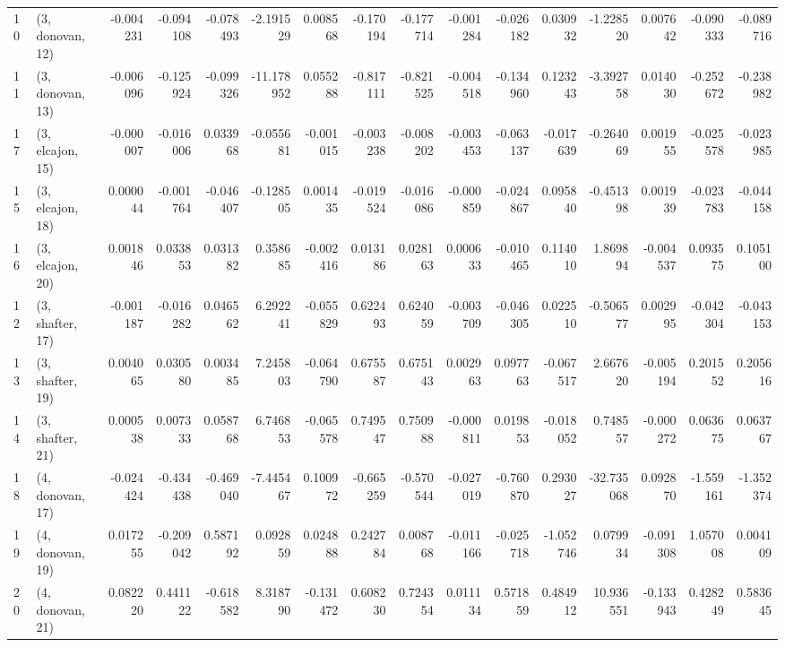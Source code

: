 \begin{tabular}{llrrrrrrrrrrrrrr}
10 &  (3, donovan, 12) &  -0.004231 & -0.094108 & -0.078493 &  -2.191529 &  0.008568 &  -0.170194 & -0.177714 & -0.001284 & -0.026182 &  0.030932 &  -1.228520 &  0.007642 & -0.090333 & -0.089716 \\
11 &  (3, donovan, 13) &  -0.006096 & -0.125924 & -0.099326 & -11.178952 &  0.055288 &  -0.817111 & -0.821525 & -0.004518 & -0.134960 &  0.123243 &  -3.392758 &  0.014030 & -0.252672 & -0.238982 \\
17 &  (3, elcajon, 15) &  -0.000007 & -0.016006 &  0.033968 &  -0.055681 & -0.001015 &  -0.003238 & -0.008202 & -0.003453 & -0.063137 & -0.017639 &  -0.264069 &  0.001955 & -0.025578 & -0.023985 \\
15 &  (3, elcajon, 18) &   0.000044 & -0.001764 & -0.046407 &  -0.128505 &  0.001435 &  -0.019524 & -0.016086 & -0.000859 & -0.024867 &  0.095840 &  -0.451398 &  0.001939 & -0.023783 & -0.044158 \\
16 &  (3, elcajon, 20) &   0.001846 &  0.033853 &  0.031382 &   0.358685 & -0.002416 &   0.013186 &  0.028163 &  0.000633 & -0.010465 &  0.114010 &   1.869894 & -0.004537 &  0.093575 &  0.105100 \\
12 &  (3, shafter, 17) &  -0.001187 & -0.016282 &  0.046562 &   6.292241 & -0.055829 &   0.622493 &  0.624059 & -0.003709 & -0.046305 &  0.022510 &  -0.506577 &  0.002995 & -0.042304 & -0.043153 \\
13 &  (3, shafter, 19) &   0.004065 &  0.030580 &  0.003485 &   7.245803 & -0.064790 &   0.675587 &  0.675143 &  0.002963 &  0.097763 & -0.067517 &   2.667620 & -0.005194 &  0.201552 &  0.205616 \\
14 &  (3, shafter, 21) &   0.000538 &  0.007333 &  0.058768 &   6.746853 & -0.065578 &   0.749547 &  0.750988 & -0.000811 &  0.019853 & -0.018052 &   0.748557 & -0.000272 &  0.063675 &  0.063767 \\
18 &  (4, donovan, 17) &  -0.024424 & -0.434438 & -0.469040 &  -7.445467 &  0.100972 &  -0.665259 & -0.570544 & -0.027019 & -0.760870 &  0.293027 & -32.735068 &  0.092870 & -1.559161 & -1.352374 \\
19 &  (4, donovan, 19) &   0.017255 & -0.209042 &  0.587192 &   0.092859 &  0.024888 &   0.242784 &  0.008768 & -0.011166 & -0.025718 & -1.052746 &   0.079934 & -0.091308 &  1.057008 &  0.004109 \\
20 &  (4, donovan, 21) &   0.082220 &  0.441122 & -0.618582 &   8.318790 & -0.131472 &   0.608230 &  0.724354 &  0.011134 &  0.571859 &  0.484912 &  10.936551 & -0.133943 &  0.428249 &  0.583645 \\

\end{tabular}
